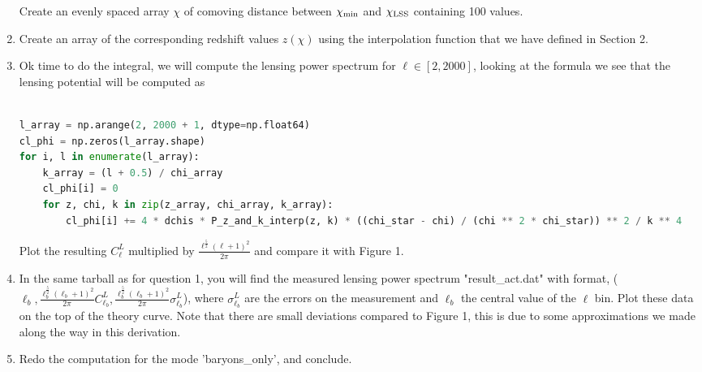 \documentclass[a4paper, 11pt]{article}
\def\ba{\begin{eqnarray}}
\def\ea{\end{eqnarray}}
\begin{document}
\begin{enumerate}
Create an evenly spaced array $\chi$ of comoving distance between $\chi_{\rm min}$ and $\chi_{\rm LSS}$ containing 100 values.
\item Create an array of the corresponding redshift values $z(\chi)$ using the interpolation function that we have defined in Section 2.
\item Ok time to do the integral, we will compute the lensing power spectrum for $\ell \in [2, 2000]$, looking at the formula we see that the lensing potential will be computed as  \\ \\

 \begin{lstlisting}[language=Python]
l_array = np.arange(2, 2000 + 1, dtype=np.float64)
cl_phi = np.zeros(l_array.shape)
for i, l in enumerate(l_array):
    k_array = (l + 0.5) / chi_array
    cl_phi[i] = 0
    for z, chi, k in zip(z_array, chi_array, k_array):
        cl_phi[i] += 4 * dchis * P_z_and_k_interp(z, k) * ((chi_star - chi) / (chi ** 2 * chi_star)) ** 2 / k ** 4
\end{lstlisting}

Plot the resulting $C_{\ell}^{L}$ multiplied by $\frac{\ell^\frac{5}{2}(\ell+1)^{2}}{2\pi}$ and compare it with Figure 1.

\item In the same tarball as for question 1, you will find the measured lensing power spectrum "result\_act.dat" with format, ($\ell_{b}, \frac{ \ell_{b}^\frac{5}{2}(\ell_{b}+1)^{2}}{2\pi} C_{\ell_{b}}^{L}, \frac{\ell_{b}^\frac{5}{2}(\ell_{b}+1)^{2}}{2\pi} \sigma_{\ell_{b}}^{L}$), where $\sigma_{\ell_{b}}^{L}$ are the errors on the measurement and $\ell_{b}$ the central value of the $\ell$ bin. Plot these data on the top of the theory curve. Note that there are small deviations compared to Figure 1, this is due to some approximations we made along the way in this derivation.
\item Redo the computation for the mode  'baryons\_only', and conclude.





\end{enumerate}

\end{document}

